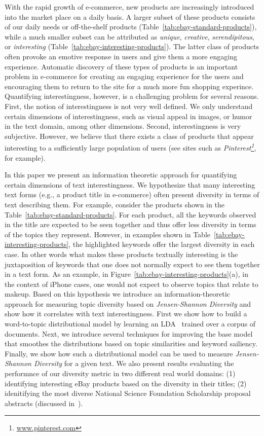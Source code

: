 


With the rapid growth of e-commerce, new products are increasingly introduced into the market place on a daily basis.  A larger subset of these products consists of our daily needs or off-the-shelf products (Table~\ref{tab:ebay-standard-products}), while a much smaller subset can be attributed as {\em unique}, {\em creative}, {\em serendipitous}, or {\em interesting} (Table~\ref{tab:ebay-interesting-products}). The latter class of products often provoke an emotive response in users and give them a more engaging experience. Automatic discovery of these types of products is an important problem in e-commerce for creating an engaging experience for the users and encouraging them to return to the site for a much more fun shopping experince. Quantifying interestingness, however,  is a challenging problem for several reasons. First, the notion of interestingness is not very well defined. We only understand certain dimensions of interestingness, such as visual appeal in images, or humor in the text domain, among other dimensions. Second, interestingness is very subjective. However, we believe that there exists a class of products that appear interesting to a sufficiently large population of users (see sites such as {\em Pinterest\footnote{\url{www.pinterest.com}}}, for example).  

In this paper we present an information theoretic approach for quantifying certain dimensions of text interestingness. We hypothesize that many interesting text forms (e.g., a product title in e-commerce) often present diversity in terms of text describing them. For example, consider the products shown in the Table~\ref{tab:ebay-standard-products}. For each product, all the keywords observed in the title are expected to be seen together and thus offer less diversity in terms of the topics they represent. However, in examples shown in Table~\ref{tab:ebay-interesting-products}, the highlighted keywords 
offer the largest diversity in each case. In other words what makes these products textually interesting is the juxtaposition of keywords that one does not normally expect to see them together in a text form. As an example, in Figure~\ref{tab:ebay-interesting-products}(a), in the context of iPhone cases, one would not expect to observe topics that relate to makeup. Based on this hypothesis we introduce an information-theoretic approach for measuring topic diversity based on {\em Jensen-Shannon Diversity} and show how it correlates with text interestingness. First we show how to build a word-to-topic distributional model by learning an LDA~\cite{Blei:2003:LDA:944919.944937} trained over a corpus of documents. Next, we introduce several techniques for improving the base model that smoothes the distributions based on topic similarities and keyword sailiency. Finally, we show how such a distributional model can be used to measure {\em Jensen-Shannon Diversity} for a given text. We also present results evaluating the performnce of our diversity metric in two different real world domains: (1) identifying interesting eBay products based on the diversity in their titles; (2) idenitifying the most diverse National Science Foundation Scholarship proposal abstracts (discussed in~\cite{bache:2013}). 

